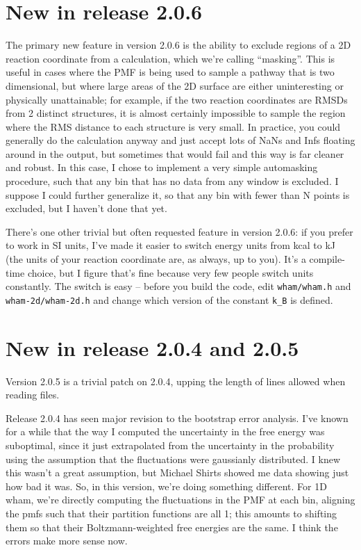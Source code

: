 \documentclass[12pt]{article}
\begin{document}
\section{New in release 2.0.6}

The primary new feature in version 2.0.6 is the ability to exclude regions
of a 2D reaction coordinate from a calculation, which we're calling
``masking''.  This is useful in cases where the PMF is being used to sample a
pathway that is two dimensional, but where large areas of the 2D surface are
either uninteresting or physically unattainable; for example, if the two
reaction coordinates are RMSDs from 2 distinct structures, it is almost
certainly impossible to sample the region where the RMS distance to each
structure is very small.  In practice, you could generally do the calculation
anyway and just accept lots of NaNs and Infs floating around in the output,
but sometimes that would fail and this way is far cleaner and robust.  In
this case, I chose to implement a very simple automasking procedure, such
that any bin that has no data from any window is excluded.  I suppose I could
further generalize it, so that any bin with fewer than N points is excluded,
but I haven't done that yet.

There's one other trivial but often requested feature in version 2.0.6: if
you prefer to work in SI units, I've made it easier to switch energy units 
from kcal to kJ (the units of your reaction coordinate are, as always, up to
you).  It's a compile-time choice, but I figure that's fine because very few
people switch units constantly.  The switch is easy -- before you build the
code, edit {\tt wham/wham.h} and {\tt wham-2d/wham-2d.h} and change which
version of the constant {\tt k\_B} is defined.

\section{New in release 2.0.4 and 2.0.5}

Version 2.0.5 is a trivial patch on 2.0.4, upping the length of lines allowed
when reading files.

Release 2.0.4 has seen major revision to the bootstrap error analysis.  
I've known for a while that the way I computed the uncertainty in the free
energy was suboptimal, since it just extrapolated from the uncertainty in the
probability using the assumption that the fluctuations were gaussianly
distributed.  I knew this wasn't a great assumption, but Michael Shirts
showed me data showing just how bad it was.  So, in this version, we're doing
something different.  For 1D wham, we're directly computing the fluctuations
in the PMF at each bin, aligning the pmfs such that their partition functions
are all 1; this amounts to shifting them so that their Boltzmann-weighted
free energies are the same.  I think the errors make more sense now.
\end{document}
